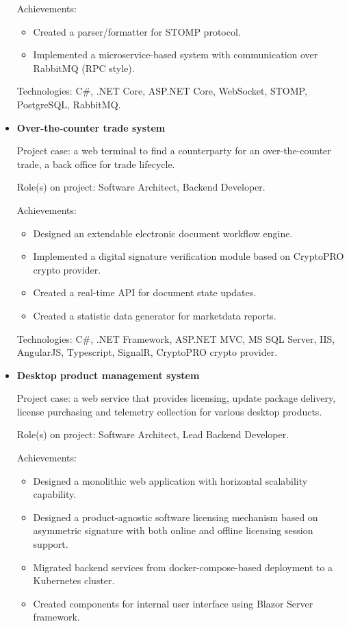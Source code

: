 \documentclass{article}
\begin{document}
\begin{itemize}
{        Achievements:
        
            \begin{itemize}
                \item Created a parser/formatter for STOMP protocol.
                \item Implemented a microservice-based system with communication over RabbitMQ (RPC style).
            \end{itemize}
        
        Technologies: C\#, .NET Core, ASP.NET Core, WebSocket, STOMP, PostgreSQL, RabbitMQ.
    }
    \item {
        \textbf{Over-the-counter trade system}
        
        Project case: a web terminal to find a counterparty for an over-the-counter trade,
        a back office for trade lifecycle.
        
        Role(s) on project: Software Architect, Backend Developer.
        
        Achievements:
        
            \begin{itemize}
                \item Designed an extendable electronic document workflow engine.
                \item Implemented a digital signature verification module based on CryptoPRO crypto provider.
                \item Created a real-time API for document state updates.
                \item Created a statistic data generator for marketdata reports.
            \end{itemize}
        
        Technologies: C\#, .NET Framework, ASP.NET MVC, MS SQL Server, IIS, AngularJS, Typescript, SignalR, CryptoPRO crypto provider.
    }
    \item {
        \textbf{Desktop product management system}
        
        Project case: a web service that provides licensing, update package delivery, license purchasing and telemetry collection for various desktop products.
        
        Role(s) on project: Software Architect, Lead Backend Developer.
        
        Achievements:
        
            \begin{itemize}
                \item Designed a monolithic web application with horizontal scalability capability.
                \item Designed a product-agnostic software licensing mechanism based on asymmetric signature with both online and offline licensing session support.
                \item Migrated backend services from docker-compose-based deployment to a Kubernetes cluster.
                \item Created components for internal user interface using Blazor Server framework.
            \end{itemize}
        
}
\end{itemize}
\end{document}
